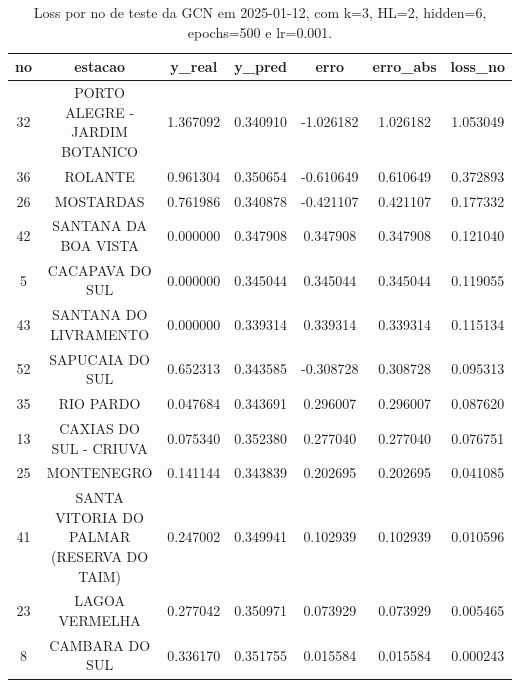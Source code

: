 \begin{table}[h]
\centering
\caption{Loss por no de teste da GCN em 2025-01-12, com k=3, HL=2, hidden=6, epochs=500 e lr=0.001.}
\label{tab:gcn_loss_k3_hl2_h6_e500_d20250112}
\begin{tabular}{ccccccc}
\toprule
no & estacao & y\_real & y\_pred & erro & erro\_abs & loss\_no \\
\midrule
32 & PORTO ALEGRE - JARDIM BOTANICO & 1.367092 & 0.340910 & -1.026182 & 1.026182 & 1.053049 \\
36 & ROLANTE & 0.961304 & 0.350654 & -0.610649 & 0.610649 & 0.372893 \\
26 & MOSTARDAS & 0.761986 & 0.340878 & -0.421107 & 0.421107 & 0.177332 \\
42 & SANTANA DA BOA VISTA & 0.000000 & 0.347908 & 0.347908 & 0.347908 & 0.121040 \\
5 & CACAPAVA DO SUL & 0.000000 & 0.345044 & 0.345044 & 0.345044 & 0.119055 \\
43 & SANTANA DO LIVRAMENTO & 0.000000 & 0.339314 & 0.339314 & 0.339314 & 0.115134 \\
52 & SAPUCAIA DO SUL & 0.652313 & 0.343585 & -0.308728 & 0.308728 & 0.095313 \\
35 & RIO PARDO & 0.047684 & 0.343691 & 0.296007 & 0.296007 & 0.087620 \\
13 & CAXIAS DO SUL - CRIUVA & 0.075340 & 0.352380 & 0.277040 & 0.277040 & 0.076751 \\
25 & MONTENEGRO & 0.141144 & 0.343839 & 0.202695 & 0.202695 & 0.041085 \\
41 & SANTA VITORIA DO PALMAR (RESERVA DO TAIM) & 0.247002 & 0.349941 & 0.102939 & 0.102939 & 0.010596 \\
23 & LAGOA VERMELHA & 0.277042 & 0.350971 & 0.073929 & 0.073929 & 0.005465 \\
8 & CAMBARA DO SUL & 0.336170 & 0.351755 & 0.015584 & 0.015584 & 0.000243 \\
\bottomrule
\end{tabular}
\end{table}
